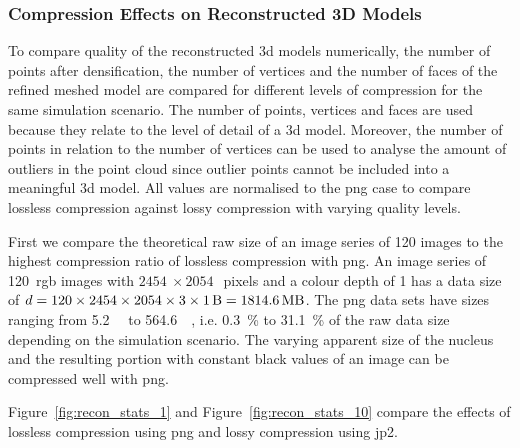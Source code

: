 \subsubsection{Compression Effects on Reconstructed 3D Models}
To compare  quality of the reconstructed \gls{3d} models numerically, the number of points after densification, the number of vertices and the number of faces of the refined meshed model are compared for different levels of compression for the same simulation scenario. The number of points, vertices and faces are used because they relate to the level of detail of a \gls{3d} model. Moreover, the number of points in relation to the number of vertices can be used to analyse the amount of outliers in the point cloud since outlier points cannot be included into a meaningful \gls{3d} model. All values are normalised to the \gls{png} case to compare lossless compression against lossy compression with varying quality levels.

First we compare the theoretical raw size of an image series of \SI{120}{} images to the highest compression ratio of lossless compression with \gls{png}. An image series of \SI{120}{}~\gls{rgb} images with $\SI{2454}{} \times \SI{2054}{}$~pixels and a colour depth of \SI{1}{\byte} has a data size of $d = 120 \times 2454 \times 2054 \times 3 \times \SI{1}{\byte} = \SI{1814.6}{\mega\byte}$. The \gls{png} data sets have sizes ranging from \SI{5.2}{\mega\byte} to \SI{564.6}{\mega\byte}, i.e. \SI{0.3}{\percent} to \SI{31.1}{\percent} of the raw data size depending on the simulation scenario. The varying apparent size of the nucleus and the resulting portion with constant black values of an image can be compressed well with \gls{png}.

Figure~\ref{fig:recon_stats_1} and Figure~\ref{fig:recon_stats_10} compare the effects of lossless compression using \gls{png} and lossy compression using \gls{jp2}.


